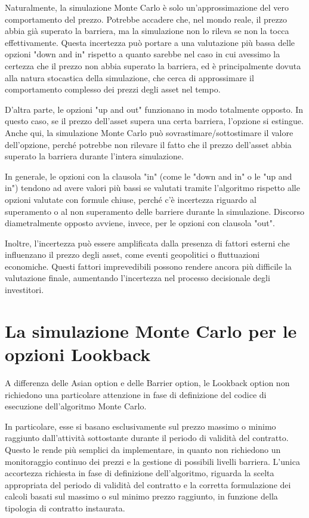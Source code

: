 \documentclass[12pt,a4paper]{report}
\begin{document}
Naturalmente, la simulazione Monte Carlo è solo un'approssimazione del vero comportamento del prezzo. Potrebbe accadere che, nel mondo reale, il prezzo abbia già superato la barriera, ma la simulazione non lo rileva se non la tocca effettivamente. Questa incertezza può portare a una valutazione più bassa delle opzioni "down and in" rispetto a quanto sarebbe nel caso in cui avessimo la certezza che il prezzo non abbia superato la barriera, ed è principalmente dovuta alla natura stocastica della simulazione, che cerca di approssimare il comportamento complesso dei prezzi degli asset nel tempo.

D'altra parte, le opzioni "up and out" funzionano in modo totalmente opposto. In questo caso, se il prezzo dell'asset supera una certa barriera, l'opzione si estingue. Anche qui, la simulazione Monte Carlo può sovrastimare/sottostimare il valore dell'opzione, perché potrebbe non rilevare il fatto che il prezzo dell'asset abbia superato la barriera durante l'intera simulazione.

In generale, le opzioni con la clausola "in" (come le "down and in" o le "up and in") tendono ad avere valori più bassi se valutati tramite l'algoritmo rispetto alle opzioni valutate con formule chiuse, perché c'è incertezza riguardo al superamento o al non superamento delle barriere durante la simulazione. Discorso diametralmente opposto avviene, invece, per le opzioni con clausola "out". 

Inoltre, l'incertezza può essere amplificata dalla presenza di fattori esterni che influenzano il prezzo degli asset, come eventi geopolitici o fluttuazioni economiche. Questi fattori imprevedibili possono rendere ancora più difficile la valutazione finale, aumentando l'incertezza nel processo decisionale degli investitori.

 
\section{La simulazione Monte Carlo per le opzioni Lookback}

A differenza delle Asian option e delle Barrier option, le Lookback option non richiedono una particolare attenzione in fase di definizione del codice di esecuzione dell'algoritmo Monte Carlo.

In particolare,  esse si basano esclusivamente sul prezzo massimo o minimo raggiunto dall'attività sottostante durante il periodo di validità del contratto. Questo le rende più semplici da implementare, in quanto non richiedono un monitoraggio continuo dei prezzi e la gestione di possibili livelli barriera. L'unica accortezza richiesta in fase di definizione dell'algoritmo, riguarda la scelta appropriata del periodo di validità del contratto e la corretta formulazione dei calcoli basati sul massimo o sul minimo prezzo raggiunto, in funzione della tipologia di contratto instaurata. 
\end{document}
